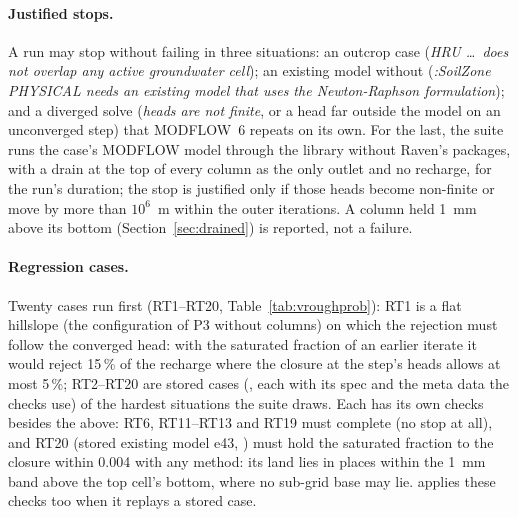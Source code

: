 \paragraph{Justified stops.} A run may stop without failing in three situations: an outcrop case (\emph{HRU \dots\ does
not overlap any active groundwater cell}); an existing model without  (\emph{:SoilZone PHYSICAL needs an
existing model that uses the Newton-Raphson formulation}); and a diverged solve (\emph{heads are not finite}, or a head
far outside the model on an unconverged step) that MODFLOW~6 repeats on its own. For the last, the suite runs the case's
MODFLOW model through the library without Raven's packages, with a drain at the top of every column as the only outlet
and no recharge, for the run's duration; the stop is justified only if those heads become non-finite or move by more
than $10^6$~m within the outer iterations. A column held 1~mm above its bottom (Section~\ref{sec:drained}) is reported,
not a failure.

\paragraph{Regression cases.} Twenty cases run first (RT1--RT20, Table~\ref{tab:vroughprob}): RT1 is a flat hillslope (the
configuration of P3 without columns) on which the rejection must follow the converged head: with the saturated fraction of
an earlier iterate it would reject 15\,\% of the recharge where the closure at the step's heads allows at most 5\,\%;
RT2--RT20 are stored cases (, each with its spec and the meta data the checks use) of the hardest
situations the suite draws. Each has
its own checks besides the above: RT6, RT11--RT13 and RT19 must complete (no stop at all), and RT20 (stored existing model e43,
) must hold the saturated fraction to the closure within 0.004 with any method: its land lies in
places within the 1~mm band above the top cell's bottom, where no sub-grid base may lie.  applies these checks
too when it replays a stored case.

